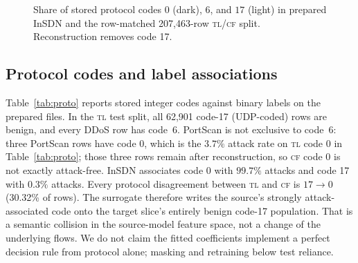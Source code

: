 \documentclass[conference,a4paper]{IEEEtran}
\begin{document}
\begin{figure}[t]\centering
{}
\caption{Share of stored protocol codes $0$ (dark), $6$, and $17$ (light) in prepared InSDN and the row-matched 207,463-row \textsc{tl}/\textsc{cf} split. Reconstruction removes code 17.}
\label{fig:mechanism}
\end{figure}

\subsection{Protocol codes and label associations}
Table~\ref{tab:proto} reports stored integer codes against binary labels on the prepared files. In the \textsc{tl} test split, all 62,901 code-17 (UDP-coded) rows are benign, and every DDoS row has \mbox{code 6}. PortScan is not exclusive to \mbox{code 6}: three PortScan rows have code 0, which is the $3.7\%$ attack rate on \textsc{tl} code 0 in Table~\ref{tab:proto}; those three rows remain after reconstruction, so \textsc{cf} code 0 is not exactly attack-free. InSDN associates code 0 with $99.7\%$ attacks and code 17 with $0.3\%$ attacks. Every protocol disagreement between \textsc{tl} and \textsc{cf} is $17\rightarrow0$ (30.32\% of rows). The surrogate therefore writes the source's strongly attack-associated code onto the target slice's entirely benign code-17 population. That is a semantic collision in the source-model feature space, not a change of the underlying flows. We do not claim the fitted coefficients implement a perfect decision rule from protocol alone; masking and retraining below test reliance.
\end{document}
